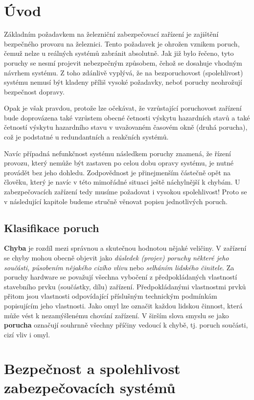 \chapter{Úvod}
  Základním požadavkem na železniční zabezpečovací zařízení je zajištění bezpečného provozu na železnici. 
  Tento požadavek je ohrožen vznikem poruch, čemuž nelze u reálných systémů zabránit absolutně. Jak již bylo 
  řečeno, tyto poruchy se nesmí projevit nebezpečným způsobem, čehož se dosahuje vhodným návrhem systému. Z 
  toho zdánlivě vyplývá, že na bezporuchovost (spolehlivost) systému nemusí být kladeny příliš vysoké 
  požadavky, neboť poruchy neohrožují bezpečnost dopravy.  

  Opak je však pravdou, protože lze očekávat, že vzrůstající poruchovost zařízení bude doprovázena také 
  vzrůstem obecné četnosti výskytu hazardních stavů a také četností výskytu hazardního stavu v uvažovaném 
  časovém okně (druhá porucha), což je podstatné u redundantních a reakčních systémů.
  
  Navíc případná nefunkčnost systému následkem poruchy znamená, že řízení provozu, který nemůže být zastaven 
  po celou dobu opravy systému, je nutné provádět bez jeho dohledu. Zodpovědnost je přinejmenším částečně 
  opět na člověku, který je navíc v této mimořádné situaci ještě náchylnější k chybám. U zabezpečovacích 
  zařízení tedy musíme požadovat i vysokou spolehlivost! Proto se v následující kapitole budeme stručně 
  věnovat popisu jednotlivých poruch.
  
  \section{Klasifikace poruch}
    \textbf{Chyba} je rozdíl mezi správnou a skutečnou hodnotou nějaké veličiny. V zařízení se chyby mohou 
    obecně objevit jako \emph{důsledek (projev) poruchy některé jeho součásti, působením nějakého cizího 
    vlivu} nebo \emph{selháním lidského činitele}. Za poruchy hardware se považují všechna vybočení z 
    předpokládaných vlastností stavebního prvku (součástky, dílu) zařízení. Předpokládanými vlastnostmi prvků 
    přitom jsou vlastnosti odpovídající příslušným technickým podmínkám popisujícím jeho vlastnosti. Jako 
    omyl lze označit každou lidskou činnost, která může vést k nezamýšlenému chování zařízení. V širším slova 
    smyslu se jako \textbf{porucha} označují souhrnně všechny příčiny vedoucí k chybě, tj. poruch součásti, 
    cizí vliv i omyl.
      
\chapter{Bezpečnost a spolehlivost zabezpečovacích systémů}
